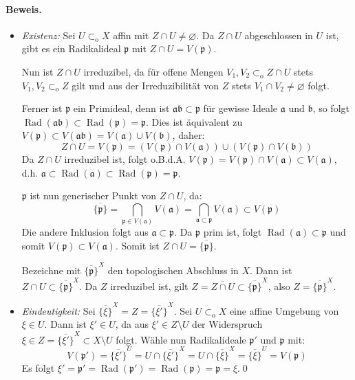 \paragraph{Beweis.}\begin{itemize}
\item \textit{Existenz:} Sei $U\subset_\text{o}X$ affin mit $Z\cap U\neq\varnothing$. Da $Z\cap U$ abgeschlossen in $U$ ist, gibt es ein Radikalideal $\mathfrak{p}$ mit $Z\cap U=V(\mathfrak{p})$.

Nun ist $Z\cap U$ irreduzibel, da für offene Mengen $V_1,V_2\subset_\text{o} Z\cap U$ stets $V_1,V_2\subset_\text{o}Z$ gilt und aus der Irreduzibilität von $Z$ stets $V_1\cap V_2\neq\varnothing$ folgt.

Ferner ist $\mathfrak{p}$ ein Primideal, denn ist $\mathfrak{ab}\subset\mathfrak{p}$ für gewisse Ideale $\mathfrak{a}$ und $\mathfrak{b}$, so folgt $\operatorname{Rad}(\mathfrak{ab})\subset\operatorname{Rad}(\mathfrak{p})=\mathfrak{p}$. Dies ist äquivalent zu $V(\mathfrak{p})\subset V(\mathfrak{ab})=V(\mathfrak{a})\cup V(\mathfrak{b})$, daher:
\[Z\cap U =V(\mathfrak{p})=(V(\mathfrak{p})\cap V(\mathfrak{a}))\cup (V(\mathfrak{p})\cap V(\mathfrak{b})) \]
Da $Z\cap U$ irreduzibel ist, folgt o.B.d.A. $V(\mathfrak{p})=V(\mathfrak{p})\cap V(\mathfrak{a})\subset V(\mathfrak{a})$, d.h. $\mathfrak{a}\subset\operatorname{Rad}(\mathfrak{a})\subset\operatorname{Rad}(\mathfrak{p})=\mathfrak{p}$.

$\mathfrak{p}$ ist nun generischer Punkt von $Z\cap U$, da:
\[\overline{\{\mathfrak{p}\}}=\bigcap_{\mathfrak{p}\in V(\mathfrak{a})}V(\mathfrak{a})=\bigcap_{\mathfrak{a}\subset\mathfrak{p}} V(\mathfrak{a})\subset V(\mathfrak{p}) \]
Die andere Inklusion folgt aus $\mathfrak{a}\subset\mathfrak{p}$. Da $\mathfrak{p}$ prim ist, folgt $\operatorname{Rad}(\mathfrak{a})\subset\mathfrak{p}$ und somit $V(\mathfrak{p})\subset V(\mathfrak{a})$. Somit ist $Z\cap U=\overline{\{\mathfrak{p}\}}$.

Bezeichne mit $\overline{\{\mathfrak{p}\}}^X$ den topologischen Abschluss in $X$. Dann ist $Z\cap U\subset\overline{\{\mathfrak{p}\}}^X$. Da $Z$ irreduzibel ist, gilt $Z=\overline{Z\cap U}\subset\overline{\{\mathfrak{p}\}}^X$, also $Z=\overline{\{\mathfrak{p}\}}^X$.
\item \textit{Eindeutigkeit:} Sei $\overline{\{\xi\}}^X=Z=\overline{\{\xi'\}}^X$. Sei $U\subset_\text{o}X$ eine affine Umgebung von $\xi\in U$. Dann ist $\xi'\in U$, da aus $\xi'\in Z\setminus U$ der Widerspruch $\xi\in Z=\overline{\{\xi'\}}^X\subset X\setminus U$ folgt. Wähle nun Radikalideale $\mathfrak{p}'$ und $\mathfrak{p}$ mit:
\[V(\mathfrak{p}')= \overline{\{\xi'\}}^U=U\cap \overline{\{\xi'\}}^X=U\cap\overline{\{\xi\}}^X=\overline{\{\xi\}}^U=V(\mathfrak{p}) \]
Es folgt $\xi'=\mathfrak{p}'=\operatorname{Rad}(\mathfrak{p}')=\operatorname{Rad}(\mathfrak{p})=\mathfrak{p}=\xi$.\qed
\end{itemize}

